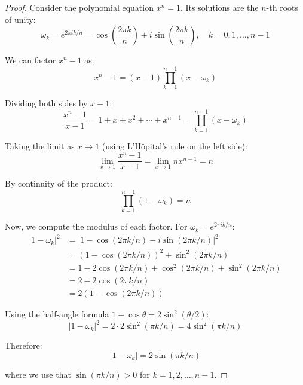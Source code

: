 \documentclass{article}
\begin{document}
\begin{proof}
Consider the polynomial equation $x^n = 1$. Its solutions are the $n$-th roots of unity:
\begin{equation}
\omega_k = e^{2\pi ik/n} = \cos\left(\frac{2\pi k}{n}\right) + i\sin\left(\frac{2\pi k}{n}\right), \quad k = 0, 1, \ldots, n-1
\end{equation}

We can factor $x^n - 1$ as:
\begin{equation}
x^n - 1 = (x-1)\prod_{k=1}^{n-1}(x - \omega_k)
\end{equation}

Dividing both sides by $x-1$:
\begin{equation}
\frac{x^n - 1}{x-1} = 1 + x + x^2 + \cdots + x^{n-1} = \prod_{k=1}^{n-1}(x - \omega_k)
\end{equation}

Taking the limit as $x \to 1$ (using L'Hôpital's rule on the left side):
\begin{equation}
\lim_{x\to 1}\frac{x^n - 1}{x-1} = \lim_{x\to 1} nx^{n-1} = n
\end{equation}

By continuity of the product:
\begin{equation}
\prod_{k=1}^{n-1}(1 - \omega_k) = n
\end{equation}

Now, we compute the modulus of each factor. For $\omega_k = e^{2\pi ik/n}$:
\begin{align}
|1 - \omega_k|^2 &= |1 - \cos(2\pi k/n) - i\sin(2\pi k/n)|^2 \\
&= (1-\cos(2\pi k/n))^2 + \sin^2(2\pi k/n) \\
&= 1 - 2\cos(2\pi k/n) + \cos^2(2\pi k/n) + \sin^2(2\pi k/n) \\
&= 2 - 2\cos(2\pi k/n) \\
&= 2(1 - \cos(2\pi k/n))
\end{align}

Using the half-angle formula $1 - \cos\theta = 2\sin^2(\theta/2)$:
\begin{equation}
|1 - \omega_k|^2 = 2 \cdot 2\sin^2(\pi k/n) = 4\sin^2(\pi k/n)
\end{equation}

Therefore:
\begin{equation}
|1 - \omega_k| = 2\sin(\pi k/n)
\end{equation}

where we use that $\sin(\pi k/n) > 0$ for $k = 1, 2, \ldots, n-1$.


\end{proof}
\end{document}
